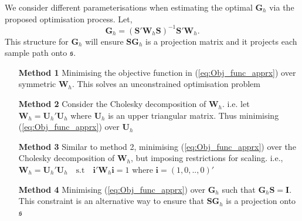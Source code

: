 \documentclass[12pt]{article}
\theoremstyle{definition}
\begin{document}
We consider different parameterisations when estimating the optimal $\bm{G}_h$ via the proposed optimisation process. Let,
\begin{equation}\label{eq:StructureofG}
\bm{G}_h = (\bm{S'W}_h\bm{S})^{-1}\bm{S'W}_h.
\end{equation}
This structure for $\bm{G}_h$ will ensure $\bm{SG}_h$ is a projection matrix and it projects each sample path onto $\mathfrak{s}$.
\begin{itemize}
	\item[\textbf{Method 1}] Minimising the objective function in (\ref{eq:Obj_func_apprx}) over symmetric $\bm{W}_h$. This solves an unconstrained optimisation problem
	\item[\textbf{Method 2}] Consider the Cholesky decomposition of $\bm{W}_h$. i.e. let $\bm{W}_h = \bm{U}_h'\bm{U}_h$ where $\bm{U}_h$ is an upper triangular matrix. Thus minimising (\ref{eq:Obj_func_apprx}) over $\bm{U}_h$
	\item[\textbf{Method 3}] Similar to method 2, minimising (\ref{eq:Obj_func_apprx}) over the Cholesky decomposition of $\bm{W}_h$, but imposing restrictions for scaling. i.e., $\bm{W}_h=\bm{U}_h'\bm{U}_h \quad \text{s.t} \quad \bm{i'}\bm{W}_h\bm{i}=1$ where $\bm{i}=(1,0,..,0)'$
	\item[\textbf{Method 4}] Minimising (\ref{eq:Obj_func_apprx}) over $\bm{G}_h$ such that $\bm{G}_h\bm{S}=\bm{I}$. This constraint is an alternative way to ensure that $\bm{SG}_h$ is a projection onto $\mathfrak{s}$
	
\end{itemize}
\end{document}
